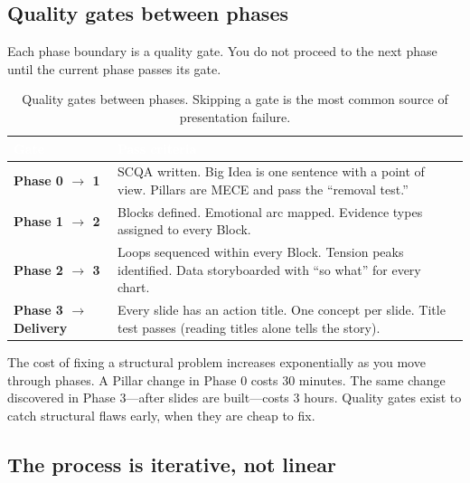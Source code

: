 \subsection{Quality gates between phases}

Each phase boundary is a quality gate. You do not proceed to the next phase until the current phase passes its gate.

\begin{table}[H]
\centering
\small
{}
\begin{tabularx}{\textwidth}{>{\bfseries\color{heading}}l X}
\toprule
\rowcolor{tableheader}
\textcolor{white}{\textbf{Gate}} & \textcolor{white}{\textbf{Pass criteria}} \\
\midrule
Phase 0 $\rightarrow$ 1 & SCQA written. Big Idea is one sentence with a point of view. Pillars are MECE and pass the ``removal test.'' \\
Phase 1 $\rightarrow$ 2 & Blocks defined. Emotional arc mapped. Evidence types assigned to every Block. \\
Phase 2 $\rightarrow$ 3 & Loops sequenced within every Block. Tension peaks identified. Data storyboarded with ``so what'' for every chart. \\
Phase 3 $\rightarrow$ Delivery & Every slide has an action title. One concept per slide. Title test passes (reading titles alone tells the story). \\
\bottomrule
\end{tabularx}
\caption{Quality gates between phases. Skipping a gate is the most common source of presentation failure.}
\label{tab:quality-gates}
\end{table}

\begin{insightbox}
The cost of fixing a structural problem increases exponentially as you move through phases. A Pillar change in Phase 0 costs 30 minutes. The same change discovered in Phase 3---after slides are built---costs 3 hours. Quality gates exist to catch structural flaws early, when they are cheap to fix.
\end{insightbox}

\subsection{The process is iterative, not linear}


